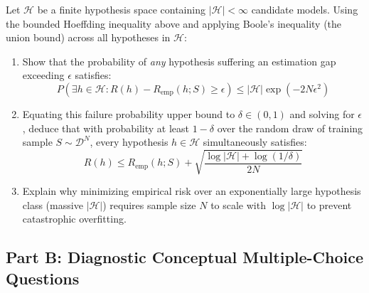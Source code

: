 \begin{enumerate}[label=\textbf{P\arabic*.}]
    Let $\mathcal{H}$ be a finite hypothesis space containing $|\mathcal{H}| < \infty$ candidate models. Using the bounded Hoeffding inequality above and applying Boole's inequality (the union bound) across all hypotheses in $\mathcal{H}$:
    \begin{enumerate}[label=(\alph*)]
        \item Show that the probability of \emph{any} hypothesis suffering an estimation gap exceeding $\epsilon$ satisfies:
        \begin{equation*}
        P\left(\exists h \in \mathcal{H} : R(h) - R_{\text{emp}}(h; S) \ge \epsilon\right) \le |\mathcal{H}| \exp\left(-2N\epsilon^2\right)
        \end{equation*}
        \item Equating this failure probability upper bound to $\delta \in (0, 1)$ and solving for $\epsilon$, deduce that with probability at least $1 - \delta$ over the random draw of training sample $S \sim \mathcal{D}^N$, every hypothesis $h \in \mathcal{H}$ simultaneously satisfies:
        \begin{equation*}
        R(h) \le R_{\text{emp}}(h; S) + \sqrt{\frac{\log |\mathcal{H}| + \log(1/\delta)}{2N}}
        \end{equation*}
        \item Explain why minimizing empirical risk over an exponentially large hypothesis class (massive $|\mathcal{H}|$) requires sample size $N$ to scale with $\log |\mathcal{H}|$ to prevent catastrophic overfitting.
    \end{enumerate}
\end{enumerate}

\subsection*{Part B: Diagnostic Conceptual Multiple-Choice Questions}

